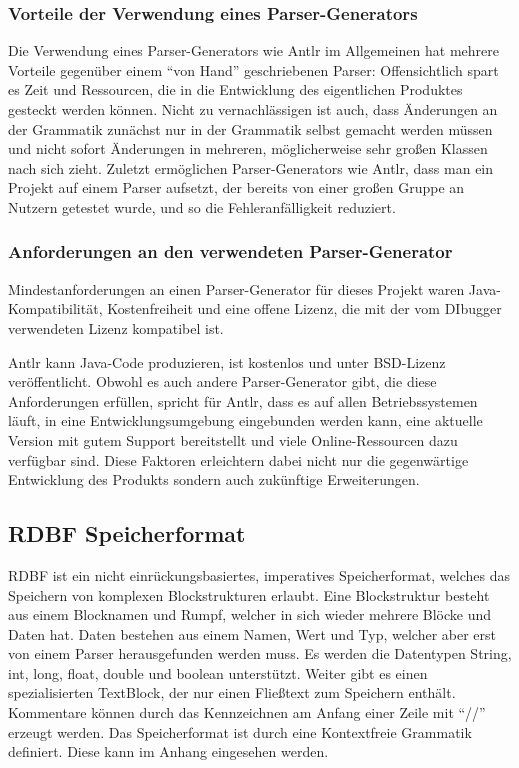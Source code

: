 \documentclass[parskip=full]{scrartcl}
\begin{document}

\subsubsection{Vorteile der Verwendung eines Parser-Generators}
Die Verwendung eines Parser-Generators wie Antlr im Allgemeinen hat mehrere Vorteile gegenüber einem “von Hand” geschriebenen Parser: Offensichtlich spart es Zeit und Ressourcen, die in die Entwicklung des eigentlichen Produktes gesteckt werden können. Nicht zu vernachlässigen ist auch, dass Änderungen an der Grammatik zunächst nur in der Grammatik selbst gemacht werden müssen und nicht sofort Änderungen in mehreren, möglicherweise sehr großen Klassen nach sich zieht. Zuletzt ermöglichen Parser-Generators wie Antlr, dass man ein Projekt auf einem Parser aufsetzt, der bereits von einer großen Gruppe an Nutzern getestet wurde, und so die Fehleranfälligkeit reduziert.


\subsubsection{Anforderungen an den verwendeten Parser-Generator}

Mindestanforderungen an einen Parser-Generator für dieses Projekt waren Java-Kompatibilität, Kostenfreiheit und eine offene Lizenz, die mit der vom DIbugger verwendeten Lizenz kompatibel ist.

Antlr kann Java-Code produzieren, ist kostenlos und unter BSD-Lizenz veröffentlicht.
Obwohl es auch andere Parser-Generator gibt, die diese Anforderungen erfüllen, spricht für Antlr, dass es auf allen Betriebssystemen läuft, in eine Entwicklungsumgebung eingebunden werden kann, eine aktuelle Version mit gutem Support bereitstellt und viele Online-Ressourcen dazu verfügbar sind.
Diese Faktoren erleichtern dabei nicht nur die gegenwärtige Entwicklung des Produkts sondern auch zukünftige Erweiterungen.

\subsection{RDBF Speicherformat}
RDBF ist ein nicht einrückungsbasiertes, imperatives Speicherformat, welches das Speichern von komplexen Blockstrukturen erlaubt.
Eine Blockstruktur besteht aus einem Blocknamen und Rumpf, welcher in sich wieder mehrere Blöcke und Daten hat.
Daten bestehen aus einem Namen, Wert und Typ, welcher aber erst von einem Parser herausgefunden werden muss.
Es werden die Datentypen String, int, long, float, double und boolean unterstützt.
Weiter gibt es einen spezialisierten TextBlock, der nur einen Fließtext zum Speichern enthält.
Kommentare können durch das Kennzeichnen am Anfang einer Zeile mit \enquote{//} erzeugt werden.
Das Speicherformat ist durch eine Kontextfreie Grammatik definiert. Diese kann im Anhang eingesehen werden. 
\end{document}
